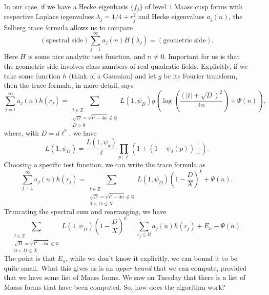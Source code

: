 \documentclass[reqno]{amsart} 
\begin{document}
In our case, if we have a Hecke eigenbasis $\{f_j\}$ of level $1$ Maass cusp forms with respective Laplace iegenvalues $\lambda_j = 1/4 + r_j^2$ and Hecke eigenvalues $a_j(n)$, the Selberg trace formula allows us to compare
\begin{equation*}
  (\text{spectral side}) \sum_{j = 1}^\infty a_j(n) H(\lambda_j) =(\text{geometric side}).
\end{equation*}
Here $H$ is some nice analytic test function, and $n \neq 0$.  Important for us is that the geometric side involves class numbers of real quadratic fields.  Explicitly, if we take some function $h$ (think of a Gaussian) and let $g$ be its Fourier transform, then the trace formula, in more detail, says
\begin{equation*}
  \sum_{j = 1}^\infty a_j(n) h(r_j)
  = \sum_{
    \substack{
      t \in \mathbb{Z}   \\
      \sqrt{D} = \sqrt{t^2 - 4 n} \notin \mathbb{Q}      \\
      D > 0
    }
  }
  L(1, \psi_D) g \left( \log \left( \frac{(\lvert t \rvert + \sqrt{D})^2}{4 n} \right)
    + \Psi(n)\right),
\end{equation*}
where, with $D = d \ell^2$, we have
\begin{equation*}
  L(1, \psi_D) = \frac{L(1, \psi_d)}{ \ell} \prod_{p \mid \ell}
  \left( 1 +(1 - \psi_d(p)) \frac{\dotsb}{\dotsb} \right).
\end{equation*}
Choosing a specific test function, we can write the trace formula as
\begin{equation*}
  \sum_{j = 1}^\infty a_j(n) h(r_j)
  = \sum_{
    \substack{
      t \in \mathbb{Z}  \\
      \sqrt{D} = \sqrt{t^2 - 4 n} \notin \mathbb{Q}
      \\
      0 < D \leq X
    }
  }
  L(1, \psi_D) \left( 1 - \frac{D}{X} \right)^k  + \Psi(n).
\end{equation*}
Truncating the spectral sum and rearranging, we have
\begin{equation}\label{eq:cnojsyvbb3}
  \sum_{
    \substack{
      t \in \mathbb{Z}  \\
      \sqrt{D} = \sqrt{t^2 - 4 n} \notin \mathbb{Q} \\ 0 < D \leq X      
    }
  } L(1, \psi_D) \left( 1 - \frac{D}{X} \right)^k =
  \sum_{r_j \leq R}
  a_j(n) h(r_j) + E_n - \Psi(n). 
\end{equation}
The point is that $E_n$, while we don't know it explicitly, we can bound it to be quite small.  What this gives us is an \emph{upper bound} that we can compute, provided that we have some list of Maass forms.  We saw on Tuesday that there is a list of Maass forms that have been computed.  So, how does the algorithm work?
\end{document}
